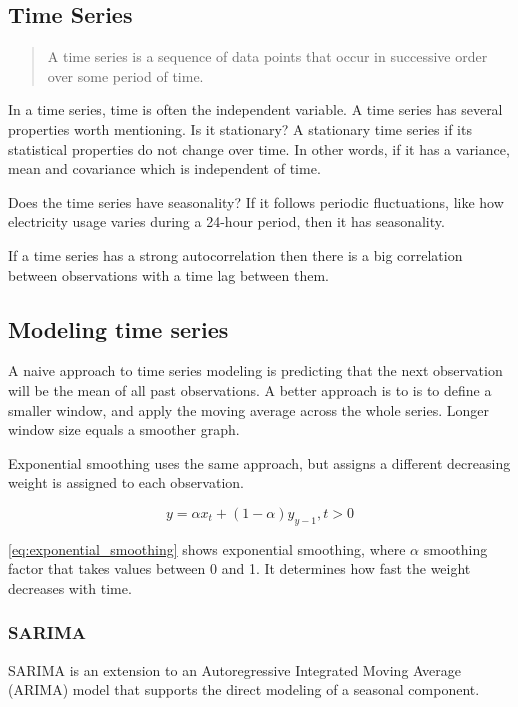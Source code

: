 \subsection{Time Series}
\label{sec:time-series}
\begin{quote}
    A time series is a sequence of data
    points that occur in successive order over some period of time.
\end{quote}
\cite{Hayes}

In a time series, time is often the independent variable.
A time series has several properties worth mentioning.
Is it stationary?
A stationary time series if its statistical properties do not change over time.
In other words, if it has a variance, mean and covariance which is independent of time.

Does the time series have seasonality?
If it follows periodic fluctuations, like how electricity usage varies during a 24-hour period,
then it has seasonality.

If a time series has a strong autocorrelation then there is a big
correlation between observations with a time lag between them.

\subsection{Modeling time series}
A naive approach to time series modeling is predicting that the next observation will be the
mean of all past observations. A better approach is to is to define a smaller window, and
apply the moving average across the whole series. Longer window size equals a smoother graph.

Exponential smoothing uses the same approach,
but assigns a different decreasing weight is assigned to each observation.

\begin{equation}
    \label{eq:exponential_smoothing}
    y = \alpha x_t + (1 - \alpha)y_{y-1}, t > 0
\end{equation}

\autoref{eq:exponential_smoothing}
shows exponential smoothing, where $\alpha$ smoothing factor
that takes values between 0 and 1. It determines how fast the weight decreases with time.



\subsubsection{SARIMA}
SARIMA is an extension to an Autoregressive Integrated Moving Average (ARIMA) model that supports the direct modeling of a seasonal component.

